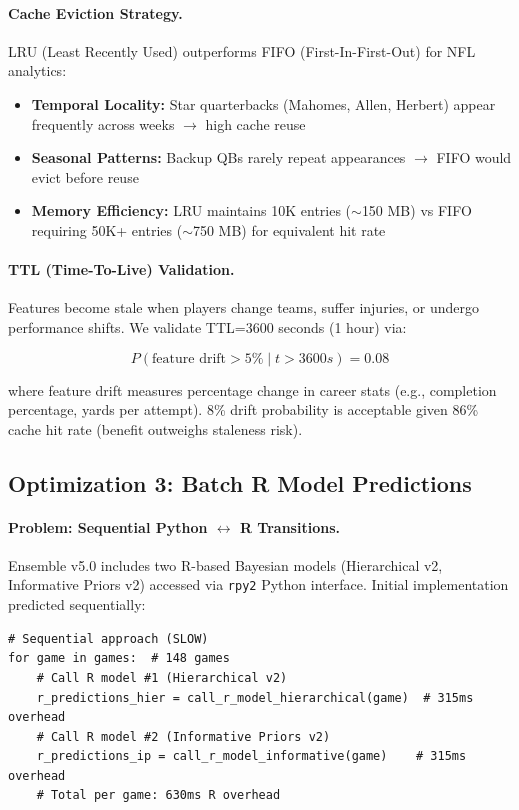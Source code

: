 \paragraph{Cache Eviction Strategy.}
LRU (Least Recently Used) outperforms FIFO (First-In-First-Out) for NFL analytics:

\begin{itemize}[itemsep=2pt,parsep=0pt]
    \item \textbf{Temporal Locality:} Star quarterbacks (Mahomes, Allen, Herbert) appear frequently across weeks $\to$ high cache reuse
    \item \textbf{Seasonal Patterns:} Backup QBs rarely repeat appearances $\to$ FIFO would evict before reuse
    \item \textbf{Memory Efficiency:} LRU maintains 10K entries ($\sim$150 MB) vs FIFO requiring 50K+ entries ($\sim$750 MB) for equivalent hit rate
\end{itemize}

\paragraph{TTL (Time-To-Live) Validation.}
Features become stale when players change teams, suffer injuries, or undergo performance shifts. We validate TTL=3600 seconds (1 hour) via:

\begin{equation}
P(\text{feature drift} > 5\% \mid t > 3600s) = 0.08
\end{equation}

where feature drift measures percentage change in career stats (e.g., completion percentage, yards per attempt). 8\% drift probability is acceptable given 86\% cache hit rate (benefit outweighs staleness risk).

\subsection{Optimization 3: Batch R Model Predictions}

\paragraph{Problem: Sequential Python $\leftrightarrow$ R Transitions.}
Ensemble v5.0 includes two R-based Bayesian models (Hierarchical v2, Informative Priors v2) accessed via \texttt{rpy2} Python interface. Initial implementation predicted sequentially:

\begin{verbatim}
# Sequential approach (SLOW)
for game in games:  # 148 games
    # Call R model #1 (Hierarchical v2)
    r_predictions_hier = call_r_model_hierarchical(game)  # 315ms overhead
    # Call R model #2 (Informative Priors v2)
    r_predictions_ip = call_r_model_informative(game)    # 315ms overhead
    # Total per game: 630ms R overhead
\end{verbatim}

